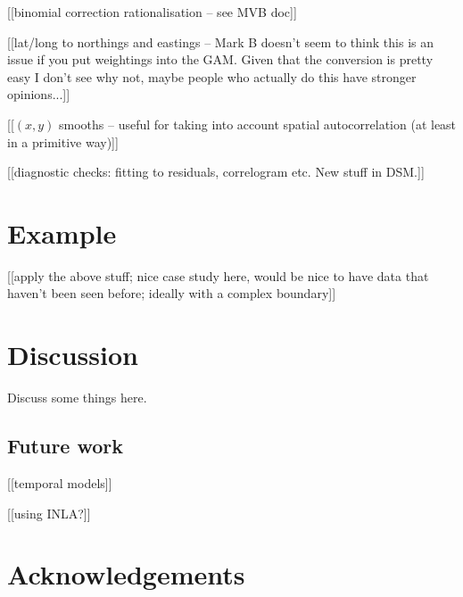 \documentclass[useAMS,referee]{biom}
\begin{document}
[[binomial correction rationalisation -- see MVB doc]]

[[lat/long to northings and eastings -- Mark B doesn't seem to think this is an issue if you put weightings into the GAM. Given that the conversion is pretty easy I don't see why not, maybe people who actually do this have stronger opinions...]]

[[$(x,y)$ smooths -- useful for taking into account spatial autocorrelation (at least in a primitive way)]]

[[diagnostic checks: fitting to residuals, correlogram etc. New stuff in DSM.]]

\section{Example}
\label{s:data}

[[apply the above stuff; nice case study here, would be nice to have data that haven't been seen before; ideally with a complex boundary]]







\section{Discussion}
\label{s:discussion}

Discuss some things here.


\subsection{Future work}

[[temporal models]]

[[using INLA?]]




\backmatter


\section*{Acknowledgements}
\end{document}
